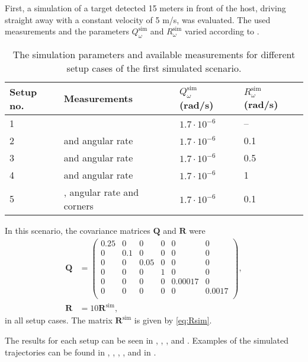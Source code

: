 First, a simulation of a target detected 15 meters in front of the host, driving straight away with a constant velocity of 5 m/s, was evaluated.
The used measurements and the parameters $Q^\text{sim}_\omega$ and $R^\text{sim}_\omega$ varied according to .
%
\begin{table}[!ht]
	\centering
	\caption{\label{tab:montesimscenario1} The simulation parameters and available measurements for different setup cases of the first simulated scenario.}
	\renewcommand{\arraystretch}{1.2}
	\begin{tabular}{|l|p{3.5cm}|l|l|}
		\hline
		\textbf{Setup no.} & \textbf{Measurements} & $Q^\text{sim}_\omega$ (rad/s) & $R^\text{sim}_\omega$ (rad/s) \\
		\hline
		1 & \abbrROI & $1.7\cdot 10^{-6}$ & -- \\
		\hline
		2 & \abbrROI and angular rate & $1.7\cdot 10^{-6}$ & 0.1 \\
		\hline
		3 & \abbrROI and angular rate & $1.7\cdot 10^{-6}$ & 0.5 \\
		\hline
		4 & \abbrROI and angular rate & $1.7\cdot 10^{-6}$ & 1 \\
		\hline
		5 & \abbrROI, angular rate and corners & $1.7\cdot 10^{-6}$ & 0.1 \\
		\hline
	\end{tabular}
\end{table}

In this scenario, the covariance matrices $\bm{Q}$ and $\bm{R}$ were
\begin{align}
	\label{eq:Qsim1}
	\bm{Q} &=
	\begin{pmatrix}
		0.25 & 0 & 0 & 0 & 0 & 0 \\
		0 & 0.1 & 0 & 0 & 0 & 0 \\
		0 & 0 & 0.05 & 0 & 0 & 0 \\
		0 & 0 & 0 & 1 & 0 & 0 \\
		0 & 0 & 0 & 0 & 0.00017 & 0 \\
		0 & 0 & 0 & 0 & 0 & 0.0017 \\
	\end{pmatrix}, \\
	\label{eq:Rsim1}
	\bm{R} &= 10 \bm{R}^\text{sim},
\end{align}
in all setup cases.
The matrix $\bm{R}^\text{sim}$ is given by \eqref{eq:Rsim}.

The results for each setup can be seen in , , ,  and .
Examples of the simulated trajectories can be found in , , , ,  and  in .

